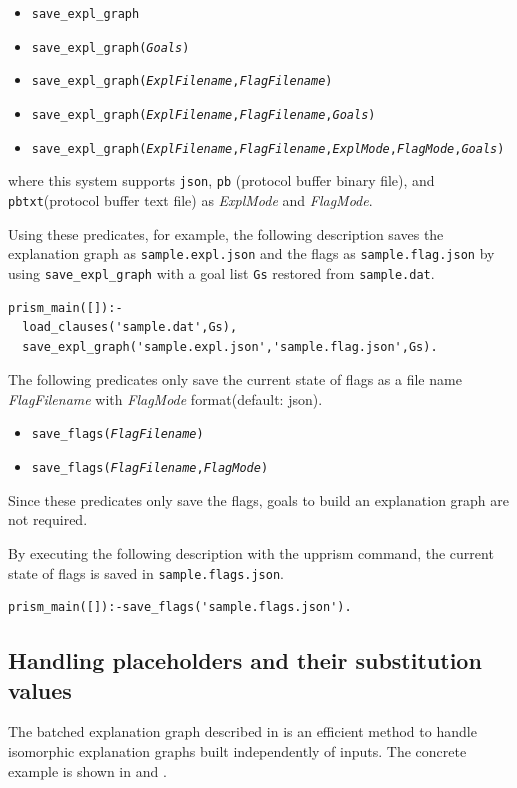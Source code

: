 \documentclass[a4paper]{report}
\begin{document}
\begin{itemize}
	\item {\tt save\_expl\_graph}
	\item {\tt save\_expl\_graph({\it Goals})}
	\item {\tt save\_expl\_graph({\it ExplFilename},{\it FlagFilename})}
	\item {\tt save\_expl\_graph({\it ExplFilename},{\it FlagFilename},{\it Goals})}
	\item {\tt save\_expl\_graph({\it ExplFilename},{\it FlagFilename},{\it ExplMode},{\it FlagMode},{\it Goals})}
\end{itemize}
where this system supports {\tt json}, {\tt pb} (protocol buffer binary file), and {\tt pbtxt}(protocol buffer text file) as {\it ExplMode} and {\it FlagMode}.

Using these predicates, for example, the following description saves the explanation graph as {\tt sample.expl.json} and the flags as {\tt sample.flag.json}
by using {\tt save\_expl\_graph} with a goal list {\tt Gs} restored from  {\tt sample.dat}.
\begin{verbatim}
prism_main([]):-
  load_clauses('sample.dat',Gs),
  save_expl_graph('sample.expl.json','sample.flag.json',Gs).
\end{verbatim}


The following predicates only save the current state of flags as a file name {\it FlagFilename} with {\it FlagMode} format(default: json).
\begin{itemize}
	\item {\tt save\_flags({\it FlagFilename})}
	\item {\tt save\_flags({\it FlagFilename},{\it FlagMode})}
\end{itemize}
Since these predicates only save the flags, goals to build an explanation graph are not required.


By executing the following description with the upprism command, the current state of flags is saved in {\tt sample.flags.json}.
\begin{verbatim}
prism_main([]):-save_flags('sample.flags.json').
\end{verbatim}


\subsection*{Handling placeholders and their substitution values}


The batched explanation graph described in  is an efficient method to handle isomorphic explanation graphs built independently of inputs.
The concrete example is shown in  and .
\end{document}
